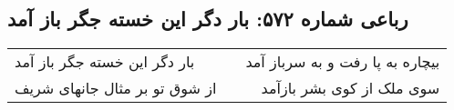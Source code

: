 \begin{center}
\section*{رباعی شماره ۵۷۲: بار دگر این خسته جگر باز آمد}
\label{sec:0572}
\begin{longtable}{l p{0.5cm} r}
بار دگر این خسته جگر باز آمد
&&
بیچاره به پا رفت و به سرباز آمد
\\
از شوق تو بر مثال جانهای شریف
&&
سوی ملک از کوی بشر بازآمد
\\
\end{longtable}
\end{center}
